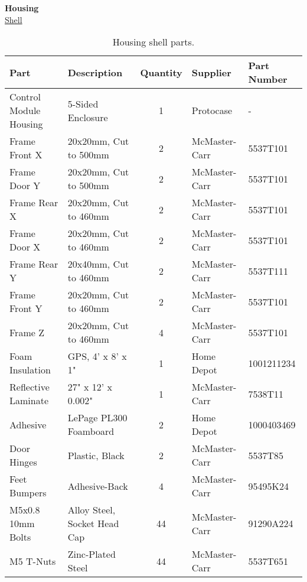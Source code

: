 \textbf{Housing}\\
\uline{Shell}
\begin{table}[!ht]
    \centering
    \begin{tabular}{|l|l|c|l|l|}
    \hline
        Part                    & Description                   & Quantity  & Supplier      & Part Number   \\ \hline
        Control Module Housing  & 5-Sided Enclosure             & 1         & Protocase     & -             \\ \hline
        Frame Front X           & 20x20mm, Cut to 500mm         & 2         & McMaster-Carr & 5537T101      \\ \hline
        Frame Door Y            & 20x20mm, Cut to 500mm         & 2         & McMaster-Carr & 5537T101      \\ \hline
        Frame Rear X            & 20x20mm, Cut to 460mm         & 2         & McMaster-Carr & 5537T101      \\ \hline
        Frame Door X            & 20x20mm, Cut to 460mm         & 2         & McMaster-Carr & 5537T101      \\ \hline
        Frame Rear Y            & 20x40mm, Cut to 460mm         & 2         & McMaster-Carr & 5537T111      \\ \hline
        Frame Front Y           & 20x20mm, Cut to 460mm         & 2         & McMaster-Carr & 5537T101      \\ \hline
        Frame Z                 & 20x20mm, Cut to 460mm         & 4         & McMaster-Carr & 5537T101      \\ \hline
        Foam Insulation         & GPS, 4' x 8' x 1"             & 1         & Home Depot    & 1001211234    \\ \hline
        Reflective Laminate     & 27" x 12' x 0.002"            & 1         & McMaster-Carr & 7538T11       \\ \hline
        Adhesive                & LePage PL300 Foamboard        & 2         & Home Depot    & 1000403469    \\ \hline
        Door Hinges             & Plastic, Black                & 2         & McMaster-Carr & 5537T85       \\ \hline
        Feet Bumpers            & Adhesive-Back                 & 4         & McMaster-Carr & 95495K24      \\ \hline
        M5x0.8 10mm Bolts       & Alloy Steel, Socket Head Cap  & 44        & McMaster-Carr & 91290A224     \\ \hline
        M5 T-Nuts               & Zinc-Plated Steel             & 44        & McMaster-Carr & 5537T651      \\ \hline
    \end{tabular}
    \caption{Housing shell parts.}
    \label{tab:housing_shell_parts}
\end{table}

